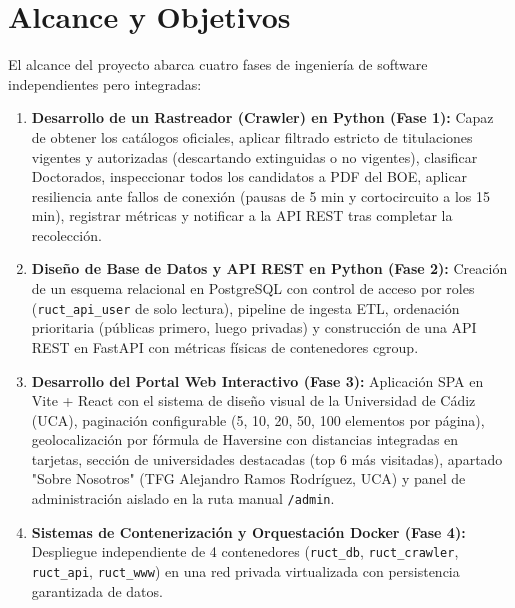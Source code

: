 \section{Alcance y Objetivos} 
El alcance del proyecto abarca cuatro fases de ingeniería de software independientes pero integradas:
\begin{enumerate}
    \item \textbf{Desarrollo de un Rastreador (Crawler) en Python (Fase 1):} Capaz de obtener los catálogos oficiales, aplicar filtrado estricto de titulaciones vigentes y autorizadas (descartando extinguidas o no vigentes), clasificar Doctorados, inspeccionar todos los candidatos a PDF del BOE, aplicar resiliencia ante fallos de conexión (pausas de 5 min y cortocircuito a los 15 min), registrar métricas y notificar a la API REST tras completar la recolección.
    \item \textbf{Diseño de Base de Datos y API REST en Python (Fase 2):} Creación de un esquema relacional en PostgreSQL con control de acceso por roles (\texttt{ruct\_api\_user} de solo lectura), pipeline de ingesta ETL, ordenación prioritaria (públicas primero, luego privadas) y construcción de una API REST en FastAPI con métricas físicas de contenedores cgroup.
    \item \textbf{Desarrollo del Portal Web Interactivo (Fase 3):} Aplicación SPA en Vite + React con el sistema de diseño visual de la Universidad de Cádiz (UCA), paginación configurable (5, 10, 20, 50, 100 elementos por página), geolocalización por fórmula de Haversine con distancias integradas en tarjetas, sección de universidades destacadas (top 6 más visitadas), apartado "Sobre Nosotros" (TFG Alejandro Ramos Rodríguez, UCA) y panel de administración aislado en la ruta manual \texttt{/admin}.
    \item \textbf{Sistemas de Contenerización y Orquestación Docker (Fase 4):} Despliegue independiente de 4 contenedores (\texttt{ruct\_db}, \texttt{ruct\_crawler}, \texttt{ruct\_api}, \texttt{ruct\_www}) en una red privada virtualizada con persistencia garantizada de datos.
\end{enumerate}

